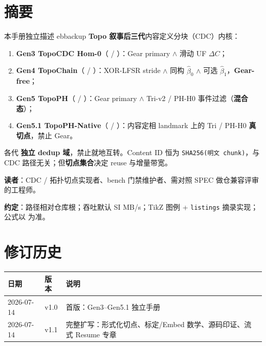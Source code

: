 \chapter*{摘要}

本手册独立描述 ebbackup \textbf{Topo 叙事后三代}内容定义分块（CDC）内核：

\begin{enumerate}[nosep]
  \item \textbf{Gen3 TopoCDC Hom-0}（ / ）：Gear primary $\wedge$ 滑动 UF $\Delta C$；
  \item \textbf{Gen4 TopoChain}（ / ）：XOR-LFSR stride $\wedge$ 同构 $\hat\beta_0$ $\wedge$ 可选 $\hat\beta_1$，\textbf{Gear-free}；
  \item \textbf{Gen5 TopoPH}（ / ）：Gear primary $\wedge$ Tri-v2 / PH-H0 事件过滤（\textbf{混合态}）；
  \item \textbf{Gen5.1 TopoPH-Native}（ / ）：内容定相 landmark 上的 Tri / PH-H0 \textbf{真切点}，禁止 Gear。
\end{enumerate}

各代 \textbf{独立 dedup 域}，禁止就地互转。Content ID 恒为 \texttt{SHA256(明文 chunk)}，与 CDC 路径无关；但\textbf{切点集合}决定 reuse 与增量带宽。

\vspace{1em}
\noindent\textbf{读者}：CDC / 拓扑切点实现者、bench 门禁维护者、需对照 SPEC 做仓兼容评审的工程师。

\vspace{1em}
\noindent\textbf{约定}：路径相对仓库根；吞吐默认 SI MB/s；TikZ 图例 + \texttt{listings} 摘录实现；公式以  为准。

\chapter*{修订历史}
\begin{longtable}{@{}llp{9cm}@{}}
\toprule
日期 & 版本 & 说明 \\
\midrule
2026-07-14 & v1.0 & 首版：Gen3--Gen5.1 独立手册 \\
2026-07-14 & v1.1 & 完整扩写：形式化切点、标定/Embed 数学、源码印证、流式 Resume 专章 \\
\bottomrule
\end{longtable}
